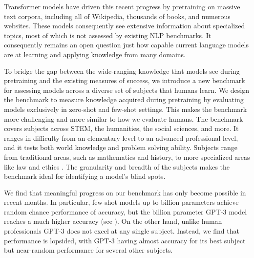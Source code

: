 \documentclass{article} \usepackage{iclr2021_conference, times}
\begin{document}
Transformer models have driven this recent progress by pretraining on massive text corpora, including all of Wikipedia, thousands of books, and numerous websites. These models consequently see extensive information about specialized topics, most of which is not assessed by existing NLP benchmarks. 
It consequently remains an open question just how capable current language models are at learning and applying knowledge from many domains.




To bridge the gap between the wide-ranging knowledge that models see during pretraining and the existing measures of success,
we introduce a new benchmark for assessing models across a diverse set of subjects that humans learn.
We design the benchmark to measure knowledge acquired during pretraining by evaluating models exclusively in zero-shot and few-shot settings. This makes the benchmark more challenging and more similar to how we evaluate humans.
The benchmark covers  subjects across STEM, the humanities, the social sciences, and more. It ranges in difficulty from an elementary level to an advanced professional level, and it tests both world knowledge and problem solving ability.
Subjects range from traditional areas, such as mathematics and history, to more specialized areas like law and ethics \citep{hendrycks2020ethicsdataset}.
The granularity and breadth of the subjects makes the benchmark ideal for identifying a model's blind spots. 





We find that meaningful progress on our benchmark has only become possible in recent months. In particular, few-shot models up to  billion parameters \citep{brown2020gpt3} achieve random chance performance of  accuracy, but the  billion parameter GPT-3 model reaches a much higher  accuracy (see ). 
On the other hand, unlike human professionals GPT-3 does not excel at any single subject.
Instead, we find that performance is lopsided, with GPT-3 having almost  accuracy for its best subject but near-random performance for several other subjects.
\end{document}
